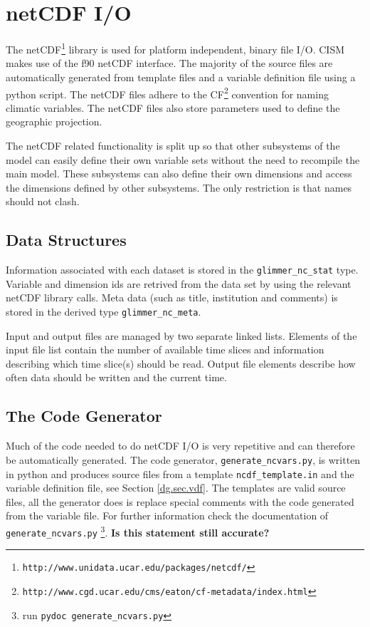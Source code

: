 \section{netCDF I/O}
\label{app:netcdfio}
The netCDF\footnote{\texttt{http://www.unidata.ucar.edu/packages/netcdf/}} library 
is used for platform independent, binary file I/O. CISM makes use of the f90 netCDF interface. 
The majority of the source files are automatically generated from template files and 
a variable definition file using a python script. The netCDF files adhere to the 
CF\footnote{\texttt{http://www.cgd.ucar.edu/cms/eaton/cf-metadata/index.html}} 
convention for naming climatic variables. The netCDF files also store parameters used to define the geographic projection.

The netCDF related functionality is split up so that other subsystems of the model 
can easily define their own variable sets without the need to recompile the main model. 
These subsystems can also define their own dimensions and access the dimensions 
defined by other subsystems. The only restriction is that names should not clash. 

\subsection{Data Structures}
Information associated with each dataset is stored in the \texttt{glimmer\_nc\_stat} type. Variable and dimension ids are retrived from the data set by using the relevant netCDF library calls. Meta data (such as title, institution and comments) is stored in the derived type \texttt{glimmer\_nc\_meta}.

Input and output files are managed by two separate linked lists. Elements of the input file list contain the number of available time slices and information describing which time slice(s) should be read. Output file elements describe how often data should be written and the current time.

\subsection{The Code Generator}
Much of the code needed to do netCDF I/O is very repetitive and can therefore 
be automatically generated. The code generator, \texttt{generate\_ncvars.py}, 
is written in python and produces source files from a template \texttt{ncdf\_template.in} 
and the variable definition file, see Section \ref{dg.sec.vdf}. The templates are 
valid source files, all the generator does is replace special comments with 
the code generated from the variable file. For further information check 
the documentation of \texttt{generate\_ncvars.py}
\footnote{run \texttt{pydoc generate\_ncvars.py}}. \textbf{Is this statement still accurate?}

